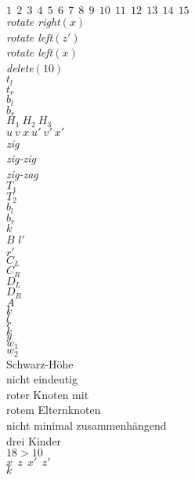 \documentclass[a4paper,12pt]{article}
\begin{document}
$1~~2~~3~~4~~5~~6~~7~~8~~9~~10~~11~~12~~13~~14~~15$  \\
\textit{rotate right}$\left(x\right)$\\
\textit{rotate left}$\left(z'\right)$\\
\textit{rotate left}$\left(x\right)$\\
\textit{delete}$\left(10\right)$\\
$t_l$\\
$t_r$\\
$b_l$\\
$b_r$\\
$H_1  ~H_2 ~ H_3$\\
$u  ~v ~  x ~ u'  ~v' ~  x' $\\
\textit{zig}\\
\textit{zig-zig}\\
\textit{zig-zag}\\
$T_1$\\
$T_2$\\
$b_l$\\
$b_r$\\
$k$\\
$B$
$l'$\\
$r'$\\
$C_L$\\
$C_R$\\
$D_L$\\
$D_R$\\
$A$\\
$k$\\
$l$\\
$r$\\
$k$\\
$y$\\
$w_1$\\
$w_2$\\
\color{Red}
Schwarz-Höhe\\ nicht eindeutig\\
roter Knoten mit\\ rotem Elternknoten\\ 
nicht minimal zusammenhängend\\
drei Kinder\\
$18 > 10$\\
\color{ForestGreen}   
$x~~z~~x'~~z'$\\
$k$






\newpage


\end{document}
